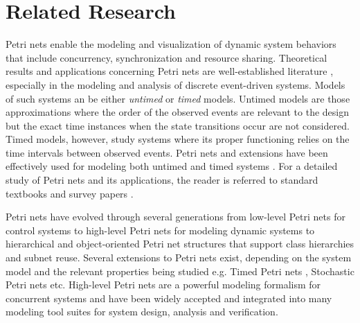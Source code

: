 \section{Related Research}
\label{sec:Related-Research}

Petri nets enable the modeling and visualization of dynamic system behaviors that include concurrency, synchronization and resource sharing. Theoretical results and applications concerning Petri nets are well-established literature \cite{david1994petri, holloway1997survey}, especially in the modeling and analysis of discrete event-driven systems. Models of such systems an be either \emph{untimed} or \emph{timed} models. Untimed models are those approximations where the order of the observed events are relevant to the design but the exact time instances when the state transitions occur are not considered. Timed models, however, study systems where its proper functioning relies on the time intervals between observed events. Petri nets and extensions have been effectively used for modeling both untimed \cite{holloway1997survey} and timed systems \cite{zuberek1991timed}. For a detailed study of Petri nets and its applications, the reader is referred to standard textbooks \cite{peterson1977petri, reisig2012petri} and survey papers \cite{murata1989petri, zhou1999modeling, zurawski1994petri}.

Petri nets have evolved through several generations from low-level Petri nets for control systems \cite{reisig2012petri} to high-level Petri nets for modeling dynamic systems \cite{jensen2012high} to hierarchical and object-oriented Petri net structures \cite{de2001object} that support class hierarchies and subnet reuse. Several extensions to Petri nets exist, depending on the system model and the relevant properties being studied e.g. Timed Petri nets \cite{wang2012timed}, Stochastic Petri nets \cite{bause1996stochastic, marsan1994modelling} etc. High-level Petri nets are a powerful modeling formalism for concurrent systems and have been widely accepted and integrated into many modeling tool suites for system design, analysis and verification. 

